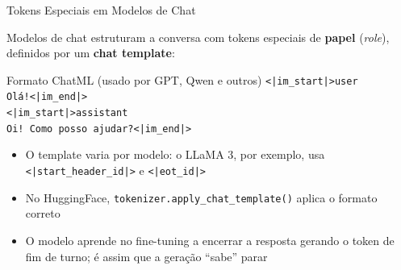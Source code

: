 \documentclass[aspectratio=169,xcolor=dvipsnames]{beamer}
\begin{document}
\begin{frame}{Tokens Especiais em Modelos de Chat}

Modelos de chat estruturam a conversa com tokens especiais de \textbf{papel} (\textit{role}), definidos por um \textbf{chat template}:

\vspace{4pt}

\begin{exampleblock}{Formato ChatML (usado por GPT, Qwen e outros)}
\texttt{<|im\_start|>user} \\
\texttt{Olá!<|im\_end|>} \\
\texttt{<|im\_start|>assistant} \\
\texttt{Oi! Como posso ajudar?<|im\_end|>}
\end{exampleblock}

\vspace{4pt}

\begin{itemize}
    \item O template varia por modelo: o LLaMA 3, por exemplo, usa \texttt{<|start\_header\_id|>} e \texttt{<|eot\_id|>}
    \item No HuggingFace, \texttt{tokenizer.apply\_chat\_template()} aplica o formato correto
    \item O modelo aprende no fine-tuning a encerrar a resposta gerando o token de fim de turno; é assim que a geração ``sabe'' parar
\end{itemize}

\end{frame}

\end{document}
